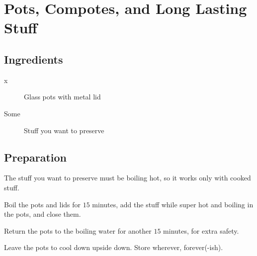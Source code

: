 \setchapterpreamble[u]{\margintoc}
\chapter{Pots, Compotes, and Long Lasting Stuff}\label{pots}


\section{Ingredients}

\begin{multicols}{2}
	\begin{description}
		\item[x] Glass pots with metal lid
		\item[Some] Stuff you want to preserve
	\end{description}
\end{multicols}	

\section{Preparation}
The stuff you want to preserve must be boiling hot, so it works only with cooked stuff.

Boil the pots and lids for $15$ minutes, add the stuff while super hot and boiling in the pots, and close them.

Return the pots to the boiling water for another $15$ minutes, for extra safety.

Leave the pots to cool down upside down. Store wherever, forever(-ish).